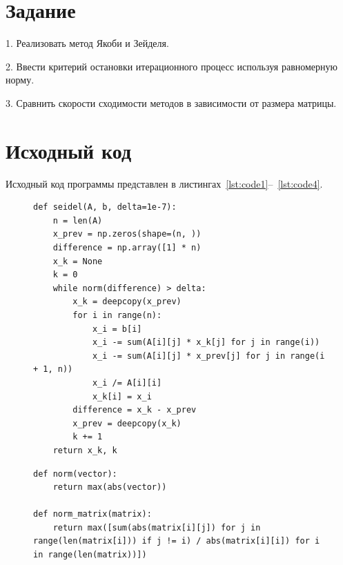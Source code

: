 \documentclass[a4paper, 14pt]{extarticle}
\begin{document}
\renewcommand{\ttdefault}{pcr}

\setlength{\tabcolsep}{3pt}
\newpage
\setcounter{page}{2}

\section{Задание}\label{Sect::task}

1. Реализовать метод Якоби и Зейделя.

2. Ввести критерий остановки итерационного процесс используя равномерную норму.

3. Сравнить скорости сходимости методов в зависимости от размера матрицы.

\newpage
\section{Исходный код}

Исходный код программы представлен в листингах~\ref{lst:code1}--~\ref{lst:code4}.

\begin{figure}[H]
\begin{lstlisting}[language={},caption={Реализация метода Зейделя},label={lst:code1}]
def seidel(A, b, delta=1e-7):
    n = len(A)
    x_prev = np.zeros(shape=(n, ))
    difference = np.array([1] * n)
    x_k = None
    k = 0
    while norm(difference) > delta:
        x_k = deepcopy(x_prev)
        for i in range(n):
            x_i = b[i]
            x_i -= sum(A[i][j] * x_k[j] for j in range(i))
            x_i -= sum(A[i][j] * x_prev[j] for j in range(i + 1, n))
            x_i /= A[i][i]
            x_k[i] = x_i
        difference = x_k - x_prev
        x_prev = deepcopy(x_k)
        k += 1
    return x_k, k
\end{lstlisting}
\end{figure}

\begin{figure}[H]
\begin{lstlisting}[language={},caption={Вычисление норм вектора и матрицы},label={lst:code2}]
def norm(vector):
    return max(abs(vector))

def norm_matrix(matrix):
    return max([sum(abs(matrix[i][j]) for j in range(len(matrix[i])) if j != i) / abs(matrix[i][i]) for i in range(len(matrix))])
\end{lstlisting}
\end{figure}
\end{document}
